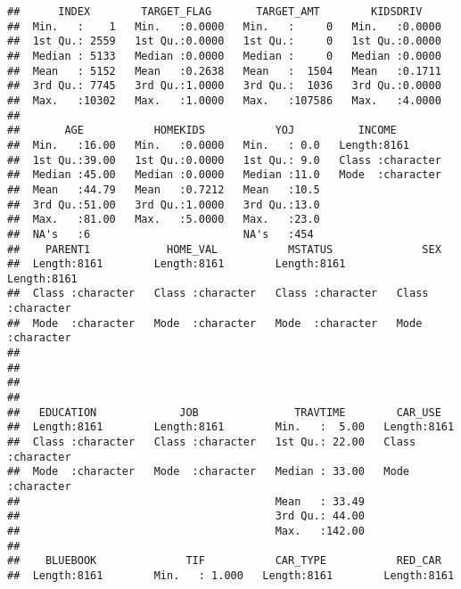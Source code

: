 \documentclass[
]{article}
\begin{document}
\begin{verbatim}
##      INDEX        TARGET_FLAG       TARGET_AMT        KIDSDRIV     
##  Min.   :    1   Min.   :0.0000   Min.   :     0   Min.   :0.0000  
##  1st Qu.: 2559   1st Qu.:0.0000   1st Qu.:     0   1st Qu.:0.0000  
##  Median : 5133   Median :0.0000   Median :     0   Median :0.0000  
##  Mean   : 5152   Mean   :0.2638   Mean   :  1504   Mean   :0.1711  
##  3rd Qu.: 7745   3rd Qu.:1.0000   3rd Qu.:  1036   3rd Qu.:0.0000  
##  Max.   :10302   Max.   :1.0000   Max.   :107586   Max.   :4.0000  
##                                                                    
##       AGE           HOMEKIDS           YOJ          INCOME         
##  Min.   :16.00   Min.   :0.0000   Min.   : 0.0   Length:8161       
##  1st Qu.:39.00   1st Qu.:0.0000   1st Qu.: 9.0   Class :character  
##  Median :45.00   Median :0.0000   Median :11.0   Mode  :character  
##  Mean   :44.79   Mean   :0.7212   Mean   :10.5                     
##  3rd Qu.:51.00   3rd Qu.:1.0000   3rd Qu.:13.0                     
##  Max.   :81.00   Max.   :5.0000   Max.   :23.0                     
##  NA's   :6                        NA's   :454                      
##    PARENT1            HOME_VAL           MSTATUS              SEX           
##  Length:8161        Length:8161        Length:8161        Length:8161       
##  Class :character   Class :character   Class :character   Class :character  
##  Mode  :character   Mode  :character   Mode  :character   Mode  :character  
##                                                                             
##                                                                             
##                                                                             
##                                                                             
##   EDUCATION             JOB               TRAVTIME        CAR_USE         
##  Length:8161        Length:8161        Min.   :  5.00   Length:8161       
##  Class :character   Class :character   1st Qu.: 22.00   Class :character  
##  Mode  :character   Mode  :character   Median : 33.00   Mode  :character  
##                                        Mean   : 33.49                     
##                                        3rd Qu.: 44.00                     
##                                        Max.   :142.00                     
##                                                                           
##    BLUEBOOK              TIF           CAR_TYPE           RED_CAR         
##  Length:8161        Min.   : 1.000   Length:8161        Length:8161       

\end{verbatim}
\end{document}

